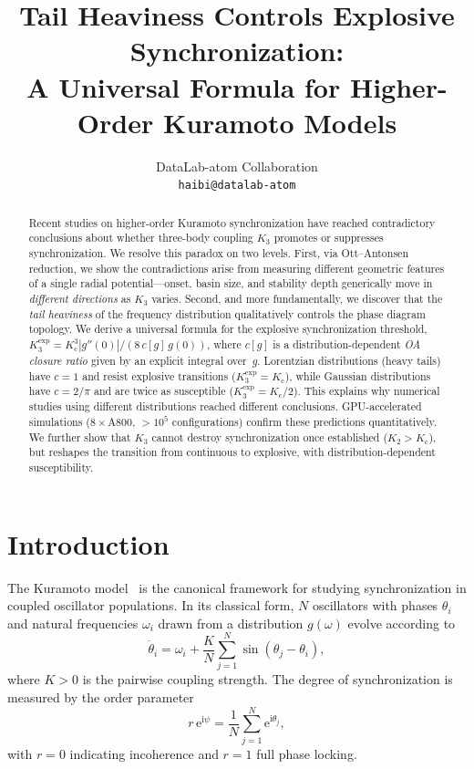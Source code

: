 \documentclass{article}
\title{Tail Heaviness Controls Explosive Synchronization: \\
A Universal Formula for Higher-Order Kuramoto Models}
\author{
  DataLab-atom Collaboration \\
  \texttt{haibi@datalab-atom}
}
\newcommand{\ii}{\mathrm{i}}
\newcommand{\ee}{\mathrm{e}}
\newcommand{\Kc}{K_{\mathrm{c}}}
\begin{document}
\maketitle

\begin{abstract}
Recent studies on higher-order Kuramoto synchronization have reached
contradictory conclusions about whether three-body coupling $K_3$ promotes or
suppresses synchronization.  We resolve this paradox on two levels.  First, via
Ott--Antonsen reduction, we show the contradictions arise from measuring
different geometric features of a single radial potential---onset, basin size,
and stability depth generically move in \emph{different directions} as $K_3$
varies.  Second, and more fundamentally, we discover that the \emph{tail
heaviness} of the frequency distribution qualitatively controls the phase
diagram topology.  We derive a universal formula for the explosive
synchronization threshold, $K_3^{\mathrm{exp}} = \Kc^3|g''(0)|/(8\,c[g]\,g(0))$,
where $c[g]$ is a distribution-dependent \emph{OA closure ratio} given by an
explicit integral over~$g$.  Lorentzian distributions (heavy tails) have $c=1$
and resist explosive transitions ($K_3^{\mathrm{exp}}=\Kc$), while Gaussian
distributions have $c=2/\pi$ and are twice as susceptible
($K_3^{\mathrm{exp}}=\Kc/2$).  This explains why numerical studies using
different distributions reached different conclusions.  GPU-accelerated
simulations ($8\times$A800, $>10^5$ configurations) confirm these predictions
quantitatively.  We further show that $K_3$ cannot destroy synchronization
once established ($K_2>\Kc$), but reshapes the transition from continuous
to explosive, with distribution-dependent susceptibility.
\end{abstract}


\section{Introduction}
\label{sec:intro}

The Kuramoto model~\citep{Kuramoto1984} is the canonical framework for
studying synchronization in coupled oscillator populations.  In its classical
form, $N$ oscillators with phases $\theta_i$ and natural frequencies $\omega_i$
drawn from a distribution $g(\omega)$ evolve according to
\begin{equation}
  \dot{\theta}_i = \omega_i + \frac{K}{N}\sum_{j=1}^{N}\sin(\theta_j - \theta_i),
  \label{eq:classic-kuramoto}
\end{equation}
where $K>0$ is the pairwise coupling strength.  The degree of synchronization
is measured by the order parameter
\begin{equation}
  r\,\ee^{\ii\psi} = \frac{1}{N}\sum_{j=1}^{N}\ee^{\ii\theta_j},
  \label{eq:order-param}
\end{equation}
with $r=0$ indicating incoherence and $r=1$ full phase locking.
\end{document}
